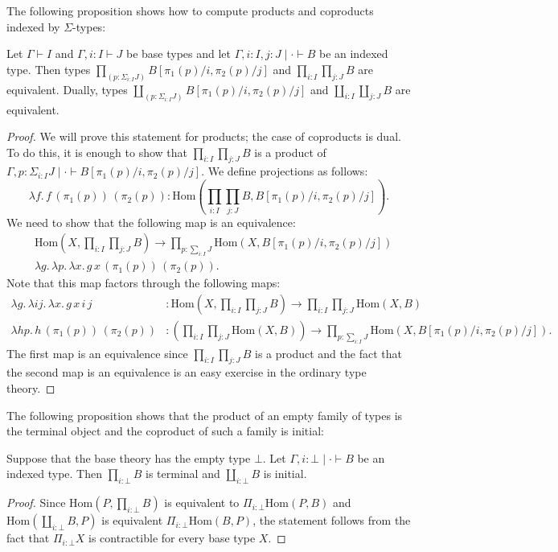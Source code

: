 \documentclass[reqno]{amsart}
\theoremstyle{definition}
\theoremstyle{remark}
\newcommand{\type}{}
\newcommand{\ob}{}
\newcommand{\fs}[1]{\mathrm{#1}}
\newcommand{\Hom}{\fs{Hom}}
\numberwithin{figure}{section}
\begin{document}
The following proposition shows how to compute products and coproducts indexed by $\Sigma$-types:

\begin{prop}
Let $\Gamma \vdash I \type$ and $\Gamma, i : I \vdash J \type$ be base types and let $\Gamma, i : I, j : J \mid \cdot \vdash B \ob$ be an indexed type.
Then types $\prod_{(p : \Sigma_{i : I} J)} B[\pi_1(p)/i, \pi_2(p)/j]$ and $\prod_{i : I} \prod_{j : J} B$ are equivalent.
Dually, types $\coprod_{(p : \Sigma_{i : I} J)} B[\pi_1(p)/i, \pi_2(p)/j]$ and $\coprod_{i : I} \coprod_{j : J} B$ are equivalent.
\end{prop}
\begin{proof}
We will prove this statement for products; the case of coproducts is dual.
To do this, it is enough to show that $\prod_{i : I} \prod_{j : J} B$ is a product of $\Gamma , p : \Sigma_{i : I} J \mid \cdot \vdash B[\pi_1(p)/i, \pi_2(p)/j] \ob$.
We define projections as follows:
\[ \lambda f.\,f\,(\pi_1(p))\,(\pi_2(p)) : \Hom(\prod_{i : I} \prod_{j : J} B, B[\pi_1(p)/i,\pi_2(p)/j]). \]
We need to show that the following map is an equivalence:
\begin{align*}
& \Hom(X, \prod_{i : I} \prod_{j : J} B) \to \prod_{p : \sum_{i : I} J} \Hom(X, B[\pi_1(p)/i,\pi_2(p)/j]) \\
& \lambda g.\,\lambda p.\,\lambda x.\,g\,x\,(\pi_1(p))\,(\pi_2(p)).
\end{align*}
Note that this map factors through the following maps:
\begin{align*}
\lambda g.\,\lambda i j.\,\lambda x.\,g\,x\,i\,j & : \Hom(X, \prod_{i : I} \prod_{j : J} B) \to \prod_{i : I} \prod_{j : J} \Hom(X,B) \\
\lambda h p.\,h\,(\pi_1(p))\,(\pi_2(p)) & : (\prod_{i : I} \prod_{j : J} \Hom(X,B)) \to \prod_{p : \sum_{i : I} J} \Hom(X, B[\pi_1(p)/i,\pi_2(p)/j]).
\end{align*}
The first map is an equivalence since $\prod_{i : I} \prod_{j : J} B$ is a product and the fact that the second map is an equivalence is an easy exercise in the ordinary type theory.
\end{proof}

The following proposition shows that the product of an empty family of types is the terminal object and the coproduct of such a family is initial:

\begin{prop}
Suppose that the base theory has the empty type $\bot$.
Let $\Gamma, i : \bot \mid \cdot \vdash B \ob$ be an indexed type.
Then $\prod_{i : \bot} B$ is terminal and $\coprod_{i : \bot} B$ is initial.
\end{prop}
\begin{proof}
Since $\Hom(P, \prod_{i : \bot} B)$ is equivalent to $\Pi_{i : \bot} \Hom(P,B)$ and $\Hom(\coprod_{i : \bot} B, P)$ is equivalent $\Pi_{i : \bot} \Hom(B,P)$,
the statement follows from the fact that $\Pi_{i : \bot} X$ is contractible for every base type $X$.
\end{proof}
\end{document}
